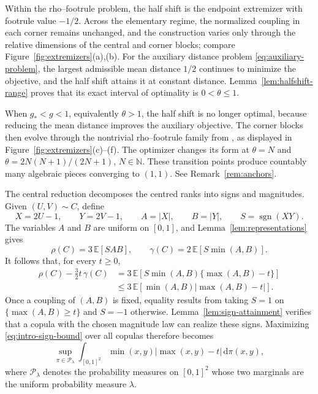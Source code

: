 \documentclass{article}
\theoremstyle{definition}
\theoremstyle{remark}
\newcommand{\1}{\mathds{1}}
\newcommand{\de}{\,\mathrm{d}}
\newcommand{\E}{\mathbb{E}}
\newcommand{\couplings}{\mathcal{P}_\lambda}
\newcommand{\I}{[0,1]}
\DeclareMathOperator{\sgn}{sgn}
\begin{document}
Within the rho--footrule problem, the half shift is the endpoint extremizer
with footrule value $-1/2$. Across the elementary regime, the normalized
coupling in each corner remains unchanged, and the construction varies only
through the relative dimensions of the central and corner blocks; compare
Figure~\ref{fig:extremizers}(a),(b). For the auxiliary distance problem
\eqref{eq:auxiliary-problem}, the largest admissible mean distance $1/2$
continues to minimize the objective, and the half shift attains it at constant
distance. Lemma~\ref{lem:halfshift-range} proves that its exact interval of
optimality is $0<\theta\le1$.

When $g_*<g<1$, equivalently $\theta>1$, the half shift is no longer optimal,
because reducing the mean distance improves the auxiliary objective. The
corner blocks then evolve through the nontrivial rho--footrule family from
\citet{ansari2026exact}, as displayed in
Figure~\ref{fig:extremizers}(c)--(f). The optimizer changes its form at
$\theta=N$ and $\theta=2N(N+1)/(2N+1)$, $N\in\mathbb N$. These transition
points produce countably many algebraic pieces converging to $(1,1)$. See
Remark~\ref{rem:anchors}.

The central reduction decomposes the centred ranks into signs and
magnitudes. Given $(U,V)\sim C$, define
\[
    X=2U-1,\qquad
    Y=2V-1,\qquad
    A=|X|,\qquad
    B=|Y|,\qquad
    S=\sgn(XY).
\]
The variables $A$ and $B$ are uniform on $\I$, and
Lemma~\ref{lem:representations} gives
\begin{equation}\label{eq:intro-signed-moments}
    \rho(C)=3\,\E[SAB],
    \qquad
    \gamma(C)=2\,\E[S\min(A,B)].
\end{equation}
It follows that, for every $t\ge0$,
\begin{equation}\label{eq:intro-sign-bound}
\begin{aligned}
    \rho(C)-\frac32t\,\gamma(C)
    &=
    3\,\E\!
    \left[
        S\min(A,B)\{\max(A,B)-t\}
    \right]\\
    &\le
    3\,\E
    \left[
        \min(A,B)|\max(A,B)-t|
    \right].
\end{aligned}
\end{equation}
Once a coupling of $(A,B)$ is fixed, equality results from taking
$S=1$ on $\{\max(A,B)\ge t\}$ and $S=-1$ otherwise.
Lemma~\ref{lem:sign-attainment} verifies that a copula with the chosen
magnitude law can realize these signs. Maximizing
\eqref{eq:intro-sign-bound} over all copulas therefore becomes
\begin{equation}\label{eq:intro-primal}
    \sup_{\pi\in\couplings}\int_{\I^2}
    \min(x,y)|\max(x,y)-t|\de\pi(x,y),
\end{equation}
where $\couplings$ denotes the probability measures on $\I^2$ whose two
marginals are the uniform probability measure $\lambda$.
\end{document}

